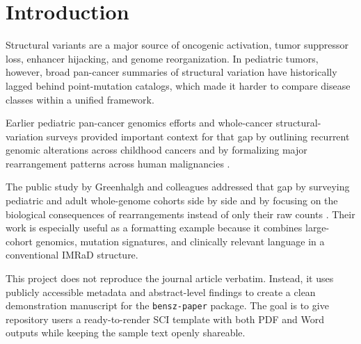 \section{Introduction}
Structural variants are a major source of oncogenic activation, tumor
suppressor loss, enhancer hijacking, and genome reorganization. In
pediatric tumors, however, broad pan-cancer summaries of structural
variation have historically lagged behind point-mutation catalogs, which
made it harder to compare disease classes within a unified framework.

Earlier pediatric pan-cancer genomics efforts and whole-cancer
structural-variation surveys provided important context for that gap by
outlining recurrent genomic alterations across childhood cancers and by
formalizing major rearrangement patterns across human malignancies
\supercite{Grobner_2018,Ma_2018,Li_2020}.

The public study by Greenhalgh and colleagues addressed that gap by
surveying pediatric and adult whole-genome cohorts side by side and by
focusing on the biological consequences of rearrangements instead of
only their raw counts \supercite{Greenhalgh_2026}. Their work is especially useful as
a formatting example because it combines large-cohort genomics, mutation
signatures, and clinically relevant language in a conventional IMRaD
structure.

This project does not reproduce the journal article verbatim. Instead,
it uses publicly accessible metadata and abstract-level findings to
create a clean demonstration manuscript for the \texttt{bensz-paper}
package. The goal is to give repository users a ready-to-render SCI
template with both PDF and Word outputs while keeping the sample text
openly shareable.

